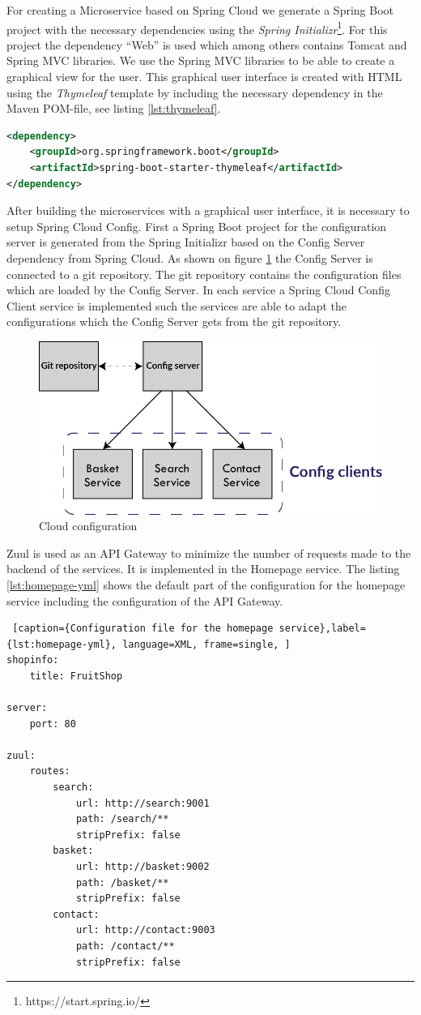 For creating a Microservice based on Spring Cloud we generate a Spring Boot project with the necessary dependencies using the \emph{Spring Initializr}\footnote{https://start.spring.io/}. For this project the dependency ``Web'' is used which among others contains Tomcat and Spring MVC libraries. We use the Spring MVC libraries to be able to create a graphical view for the user. This graphical user interface is created with HTML using the \emph{Thymeleaf} template by including the necessary dependency in the Maven POM-file, see listing \ref{lst:thymeleaf}. 
\begin{lstlisting}[caption={Thymeleaf dependency in POM-file},label={lst:thymeleaf}, language=XML, frame=single, ]
<dependency>
	<groupId>org.springframework.boot</groupId>
	<artifactId>spring-boot-starter-thymeleaf</artifactId>
</dependency>
\end{lstlisting}
After building the microservices with a graphical user interface, it is necessary to setup Spring Cloud Config.
First a Spring Boot project for the configuration server is generated from the Spring Initializr based on the Config Server dependency from Spring Cloud. As shown on figure \ref{fig:cloud-config} the Config Server is connected to a git repository. The git repository contains the configuration files which are loaded by the Config Server. In each service a Spring Cloud Config Client service is implemented such the services are able to adapt the configurations which the Config Server gets from the git repository.  
\begin{figure}[bth]
	\includegraphics[width=1\linewidth]{gfx/cloud-config}
	\caption[cloudconfig]{Cloud configuration} \label{fig:cloud-config}
\end{figure}    

Zuul is used as an API Gateway to minimize the number of requests made to the backend of the services. It is implemented in the Homepage service.
The listing \ref{lst:homepage-yml} shows the default part of the configuration for the homepage service including the configuration of the API Gateway.  
\begin{lstlisting} [caption={Configuration file for the homepage service},label={lst:homepage-yml}, language=XML, frame=single, ]
shopinfo:
	title: FruitShop
	
server:
	port: 80
	
zuul:  
	routes:
		search:
			url: http://search:9001
			path: /search/**
			stripPrefix: false
		basket:
			url: http://basket:9002
			path: /basket/**
			stripPrefix: false
		contact:
			url: http://contact:9003
			path: /contact/**
			stripPrefix: false
\end{lstlisting}

